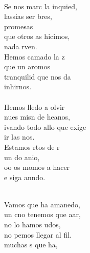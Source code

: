 \begin{cancion}%
	       \chord{(}{**)}{    }\\
	Se nos marc la inquied, \\
	lassias  ser bres,\\
	promesas\\
	que otros as hicimos,\\
	 nada rven.\\
	Hemos camado la z\\
	que un aromos\\
	  tranquilid que nos da\\
	 inhirnos.\\
\jump\\
	Hemos lledo a olvir\\
	nues misn de heanos, \\
	ivando todo allo que exige\\
	ir las nos.\\
	Estamos rtos de r\\
	un do anio,\\
	oo os momos a hacer\\
	e siga anndo.\\\jump\\
	\begin{chorus}%
	Vamos que  ha amanedo,\\
	un cno tenemos que aar,\\
	no lo hamos udos,\\
	no pemos llegar al fil.\\
	 muchas s que ha,\\

\end{chorus}
\end{cancion}
